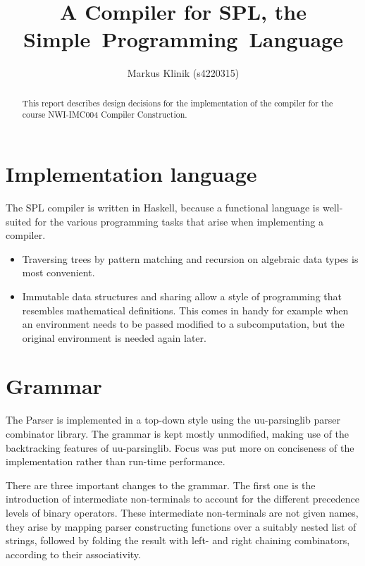 \documentclass[a4paper]{article}
\begin{document}
\title{A Compiler for SPL, the Simple~Programming~Language}
\author{Markus Klinik (s4220315)}
\maketitle

\begin{abstract}

This report describes design decisions for the implementation of the compiler
for the course NWI-IMC004 Compiler Construction.

\end{abstract}

\section{Implementation language}

The SPL compiler is written in Haskell, because a functional language is
well-suited for the various programming tasks that arise when implementing a
compiler.

\begin{itemize}

  \item Traversing trees by pattern matching and recursion on algebraic
  data types is most convenient.

  \item Immutable data structures and sharing allow a style of
  programming that resembles mathematical definitions.  This comes in
  handy for example when an environment needs to be passed modified to
  a subcomputation, but the original environment is needed again later.

\end{itemize}

\section{Grammar}

The Parser is implemented in a top-down style using the uu-parsinglib
parser combinator library.  The grammar is kept mostly unmodified,
making use of the backtracking features of uu-parsinglib.  Focus was
put more on conciseness of the implementation rather than run-time
performance.

There are three important changes to the grammar.  The first one is the
introduction of intermediate non-terminals to account for the different
precedence levels of binary operators.  These intermediate
non-terminals are not given names, they arise by mapping parser
constructing functions over a suitably nested list of strings, followed
by folding the result with left- and right chaining combinators,
according to their associativity.
\end{document}
